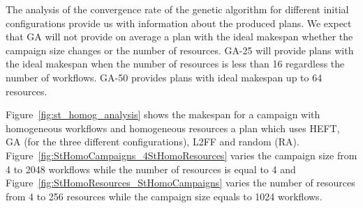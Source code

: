 The analysis of the convergence rate of the genetic algorithm for different initial configurations provide us with information about the produced plans.
We expect that GA will not provide on average a plan with the ideal makespan whether the campaign size changes or the number of resources.
GA-25 will provide plans with the ideal makespan when the number of resources is less than 16 regardless the number of workflows.
GA-50 provides plans with ideal makespan up to 64 resources.

Figure~\ref{fig:st_homog_analysis} shows the makespan for a campaign with homogeneous workflows and homogeneous resources a plan which uses HEFT, GA (for the three different configurations), L2FF and random (RA).
Figure~\ref{fig:StHomoCampaigns_4StHomoResources} varies the campaign size from 4 to 2048 workflows while the number of resources is equal to 4 and Figure~\ref{fig:StHomoResources_StHomoCampaigns} varies the number of resources from 4 to 256 resources while the campaign size equals to 1024 workflows.

